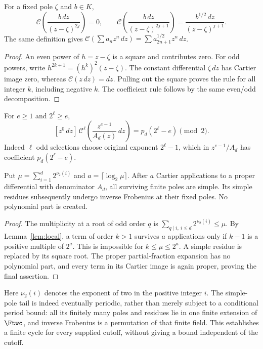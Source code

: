 \documentclass[11pt]{article}
\begin{document}
\begin{lemma}\label{lem:local}
For a fixed pole $\zeta$ and $b\in K$,
\[
 \mathcal C\!\left(\frac{b\,dz}{(z-\zeta)^{2j}}\right)=0,\qquad
 \mathcal C\!\left(\frac{b\,dz}{(z-\zeta)^{2j+1}}\right)
       =\frac{b^{1/2}\,dz}{(z-\zeta)^{j+1}}.
\]
The same definition gives
$\mathcal C(\sum a_nz^n\,dz)=\sum a_{2n+1}^{1/2}z^n\,dz$.
\end{lemma}
\begin{proof}
An even power of $h=z-\zeta$ is a square and contributes zero.
For odd powers, write $h^{2k+1}=(h^k)^2(z-\zeta)$.
The constant differential $\zeta\,dz$ has Cartier image zero,
whereas $\mathcal C(z\,dz)=dz$. Pulling out the square proves
the rule for all integer $k$, including negative $k$.
The coefficient rule follows by the same even/odd decomposition.
\end{proof}

For $e\ge1$ and $2^\ell\ge e$,
\begin{equation}\label{eq:selection}
 [z^0\,dz]\,\mathcal C^\ell\!
             \left(\frac{z^{e-1}}{A_d(z)}\,dz\right)
                   =p_d(2^\ell-e)\pmod2.
\end{equation}
Indeed $\ell$ odd selections choose original exponent $2^\ell-1$,
which in $z^{e-1}/A_d$ has coefficient $p_d(2^\ell-e)$.

\begin{lemma}\label{lem:poles}
Put $\mu=\sum_{i=1}^d2^{\nu_2(i)}$ and
$a=\lceil\log_2\mu\rceil$. After $a$ Cartier applications to
a proper differential with denominator $A_d$, all surviving finite
poles are simple. Its simple residues subsequently undergo inverse
Frobenius at their fixed poles. No polynomial part is created.
\end{lemma}
\begin{proof}
The multiplicity at a root of odd order $q$ is
$\sum_{q\mid i,\ i\le d}2^{\nu_2(i)}\le\mu$.
By Lemma~\ref{lem:local}, a term of order $k>1$ survives $a$
applications only if $k-1$ is a positive multiple of $2^a$.
This is impossible for $k\le\mu\le2^a$. A simple residue is
replaced by its square root. The proper partial-fraction expansion
has no polynomial part, and every term in its Cartier image is again
proper, proving the final assertion.
\end{proof}

Here $\nu_2(i)$ denotes the exponent of two in the positive integer
$i$. The simple-pole tail is indeed eventually periodic, rather than
merely subject to a conditional period bound: all its finitely many
poles and residues lie in one finite extension of $\Ftwo$, and
inverse Frobenius is a permutation of that finite field. This
establishes a finite cycle for every supplied cutoff, without giving
a bound independent of the cutoff.
\end{document}
